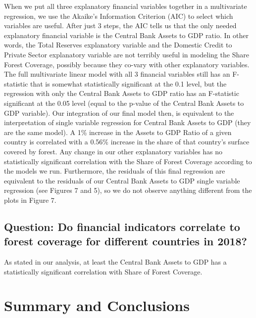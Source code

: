 \documentclass[
  12pt,
]{article}
\begin{document}
When we put all three explanatory financial variables together in a
multivariate regression, we use the Akaike's Information Criterion (AIC)
to select which variables are useful. After just 3 steps, the AIC tells
us that the only needed explanatory financial variable is the Central
Bank Assets to GDP ratio. In other words, the Total Reserves explanatory
variable and the Domestic Credit to Private Sector explanatory variable
are not terribly useful in modeling the Share Forest Coverage, possibly
because they co-vary with other explanatory variables. The full
multivariate linear model with all 3 financial variables still has an
F-statistic that is somewhat statistically significant at the 0.1 level,
but the regression with only the Central Bank Assets to GDP ratio has an
F-statistic significant at the 0.05 level (equal to the p-value of the
Central Bank Assets to GDP variable). Our integration of our final model
then, is equivalent to the interpretation of single variable regression
for Central Bank Assets to GDP (they are the same model). A 1\% increase
in the Assets to GDP Ratio of a given country is correlated with a
0.56\% increase in the share of that country's surface covered by
forest. Any change in our other explanatory variables has no
statistically significant correlation with the Share of Forest Coverage
according to the models we run. Furthermore, the residuals of this final
regression are equivalent to the residuals of our Central Bank Assets to
GDP single variable regression (see Figures 7 and 5), so we do not
observe anything different from the plots in Figure 7.

\hypertarget{question-do-financial-indicators-correlate-to-forest-coverage-for-different-countries-in-2018}{%
\subsection{Question: Do financial indicators correlate to forest
coverage for different countries in
2018?}\label{question-do-financial-indicators-correlate-to-forest-coverage-for-different-countries-in-2018}}

As stated in our analysis, at least the Central Bank Assets to GDP has a
statistically significant correlation with Share of Forest Coverage.

\newpage

\hypertarget{summary-and-conclusions}{%
\section{Summary and Conclusions}\label{summary-and-conclusions}}
\end{document}
